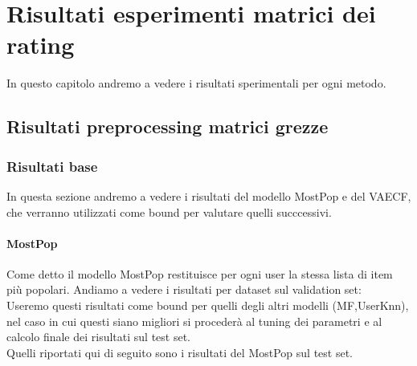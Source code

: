 \hypertarget{(chap:capitolo6)}{}
\chapter{Risultati esperimenti matrici dei rating}
In questo capitolo andremo a vedere i risultati sperimentali per ogni metodo.
\section{Risultati preprocessing matrici grezze}

\subsection{Risultati base}
In questa sezione andremo a vedere i risultati del modello MostPop e del VAECF, che verranno utilizzati come bound per valutare quelli succcessivi.

\subsubsection{MostPop}
Come detto il modello MostPop restituisce per ogni user la stessa lista di item più popolari.
Andiamo a vedere i risultati per dataset sul validation set:\\

\newpage
Useremo questi risultati come bound per quelli degli altri modelli (MF,UserKnn), nel caso in cui questi siano migliori si procederà al tuning dei parametri e al calcolo finale dei risultati sul test set.\\
Quelli riportati qui di seguito sono i risultati del MostPop sul test set.\\

